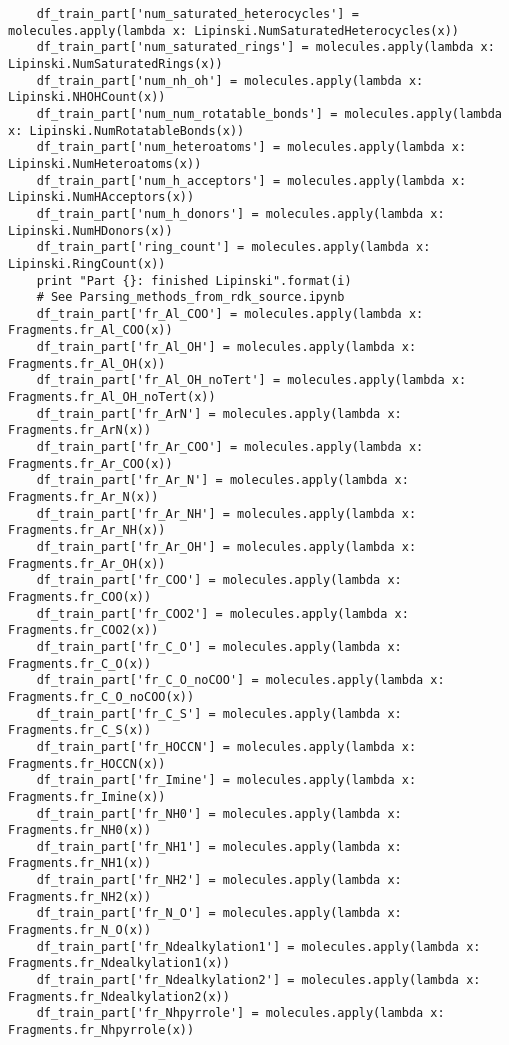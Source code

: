 \documentclass[11pt, oneside]{article}   	%
\begin{document}
\begin{lstlisting}
    df_train_part['num_saturated_heterocycles'] = molecules.apply(lambda x: Lipinski.NumSaturatedHeterocycles(x))
    df_train_part['num_saturated_rings'] = molecules.apply(lambda x: Lipinski.NumSaturatedRings(x))
    df_train_part['num_nh_oh'] = molecules.apply(lambda x: Lipinski.NHOHCount(x))
    df_train_part['num_num_rotatable_bonds'] = molecules.apply(lambda x: Lipinski.NumRotatableBonds(x))
    df_train_part['num_heteroatoms'] = molecules.apply(lambda x: Lipinski.NumHeteroatoms(x))
    df_train_part['num_h_acceptors'] = molecules.apply(lambda x: Lipinski.NumHAcceptors(x))
    df_train_part['num_h_donors'] = molecules.apply(lambda x: Lipinski.NumHDonors(x))
    df_train_part['ring_count'] = molecules.apply(lambda x: Lipinski.RingCount(x))
    print "Part {}: finished Lipinski".format(i)
    # See Parsing_methods_from_rdk_source.ipynb
    df_train_part['fr_Al_COO'] = molecules.apply(lambda x: Fragments.fr_Al_COO(x))
    df_train_part['fr_Al_OH'] = molecules.apply(lambda x: Fragments.fr_Al_OH(x))
    df_train_part['fr_Al_OH_noTert'] = molecules.apply(lambda x: Fragments.fr_Al_OH_noTert(x))
    df_train_part['fr_ArN'] = molecules.apply(lambda x: Fragments.fr_ArN(x))
    df_train_part['fr_Ar_COO'] = molecules.apply(lambda x: Fragments.fr_Ar_COO(x))
    df_train_part['fr_Ar_N'] = molecules.apply(lambda x: Fragments.fr_Ar_N(x))
    df_train_part['fr_Ar_NH'] = molecules.apply(lambda x: Fragments.fr_Ar_NH(x))
    df_train_part['fr_Ar_OH'] = molecules.apply(lambda x: Fragments.fr_Ar_OH(x))
    df_train_part['fr_COO'] = molecules.apply(lambda x: Fragments.fr_COO(x))
    df_train_part['fr_COO2'] = molecules.apply(lambda x: Fragments.fr_COO2(x))
    df_train_part['fr_C_O'] = molecules.apply(lambda x: Fragments.fr_C_O(x))
    df_train_part['fr_C_O_noCOO'] = molecules.apply(lambda x: Fragments.fr_C_O_noCOO(x))
    df_train_part['fr_C_S'] = molecules.apply(lambda x: Fragments.fr_C_S(x))
    df_train_part['fr_HOCCN'] = molecules.apply(lambda x: Fragments.fr_HOCCN(x))
    df_train_part['fr_Imine'] = molecules.apply(lambda x: Fragments.fr_Imine(x))
    df_train_part['fr_NH0'] = molecules.apply(lambda x: Fragments.fr_NH0(x))
    df_train_part['fr_NH1'] = molecules.apply(lambda x: Fragments.fr_NH1(x))
    df_train_part['fr_NH2'] = molecules.apply(lambda x: Fragments.fr_NH2(x))
    df_train_part['fr_N_O'] = molecules.apply(lambda x: Fragments.fr_N_O(x))
    df_train_part['fr_Ndealkylation1'] = molecules.apply(lambda x: Fragments.fr_Ndealkylation1(x))
    df_train_part['fr_Ndealkylation2'] = molecules.apply(lambda x: Fragments.fr_Ndealkylation2(x))
    df_train_part['fr_Nhpyrrole'] = molecules.apply(lambda x: Fragments.fr_Nhpyrrole(x))

\end{lstlisting}
\end{document}
